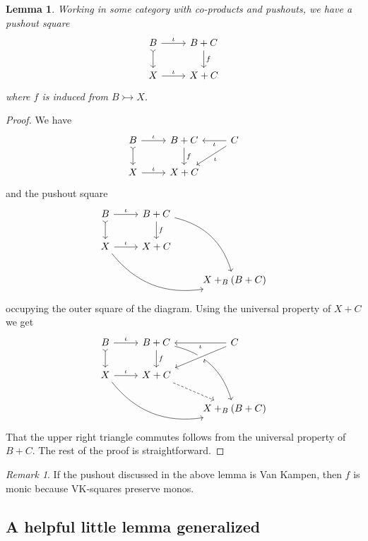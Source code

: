 \documentclass[12pt]{article}
\renewcommand{\(}{\left(}
\renewcommand{\)}{\right)}
\renewcommand{\{}{\left\lbrace}
\renewcommand{\}}{\right\rbrace}
\newtheorem*{lem}{Lemma}
\theoremstyle{remark}
\newtheorem*{remark}{Remark}
\theoremstyle{definition}
\begin{document}
\begin{lem}
	Working in some category with co-products and pushouts, we have a pushout square
	\[
		\begin{tikzcd}
			{B} \ar[r,"\iota"] \ar[d,rightarrowtail] &
			{B+C} \ar[d,"f"] \\
			{X} \ar[r, "\iota"]&
			{X+C}
		\end{tikzcd}
	\]
	where $f$ is induced from $B \rightarrowtail X$.
\end{lem}
 \begin{proof}
 	We have 
 	\[
 		\begin{tikzcd}
	 		{B} \ar[r,"\iota"] \ar[d,rightarrowtail] &
	 		{B+C} \ar[d,"f"] &
	 		{C} \ar[l,"\iota"] \ar[dl,"\iota"]\\
	 		{X} \ar[r, "\iota"]&
	 		{X+C}
	 	\end{tikzcd}
 	\]
 	and the pushout square
 	\[
	 	\begin{tikzcd}
		 	{B} \ar[r,"\iota"] \ar[d,rightarrowtail] &
		 	{B+C} \ar[d,"f"] \ar[ddr,bend left]&
		 	{} \\
		 	{X} \ar[r, "\iota"] \ar[rrd,bend right] &
		 	{X+C} &
		 	{} \\
		 	{} &
		 	{} &
		 	{X+_B(B+C)}
 	\end{tikzcd}
 	\]
 	occupying the outer square of the diagram. 
 	Using the universal property of $X+C$ we get
  	\[
	  	\begin{tikzcd}
		  	{B} \ar[r,"\iota"] \ar[d,rightarrowtail] &
		  	{B+C} \ar[d,"f"] \ar[ddr,bend left]&
		  	{C} \ar[l,"\iota"] \ar[dl,"\iota",crossing over]  \\
		  	{X} \ar[r, "\iota"] \ar[rrd,bend right] &
		  	{X+C} \ar[dr,dashed]&
		  	{}\\
		  	{} &
		  	{} &
		  	{X+_B(B+C)}
	  	\end{tikzcd}
  	\]
  	That the upper right triangle commutes follows from the universal property of $B+C$.  The rest of the proof is straightforward. 
 \end{proof}
 
 \begin{remark}
 	If the pushout discussed in the above lemma is Van Kampen, then $f$ is monic because VK-squares preserve monos.
 \end{remark}
 
 \subsection*{A helpful little lemma generalized}
 
\end{document}
